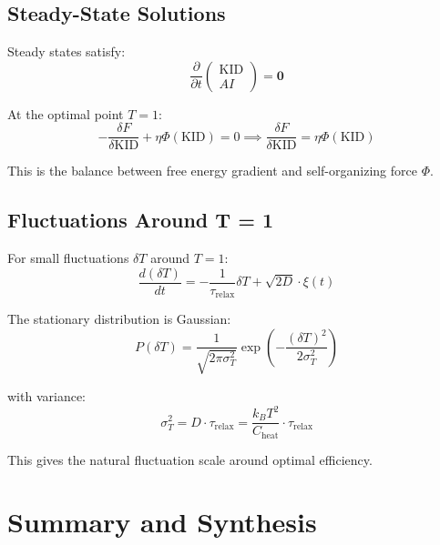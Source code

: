 \documentclass[11pt,a4paper]{article}
\begin{document}
\subsection{Steady-State Solutions}

Steady states satisfy:
\begin{equation}
\frac{\partial}{\partial t}\begin{pmatrix} \text{KID} \\ AI \end{pmatrix} = \mathbf{0}
\end{equation}

At the optimal point $T = 1$:
\begin{equation}
-\frac{\delta F}{\delta \text{KID}} + \eta \Phi(\text{KID}) = 0 \implies \frac{\delta F}{\delta \text{KID}} = \eta \Phi(\text{KID})
\end{equation}

This is the balance between free energy gradient and self-organizing force $\Phi$.

\subsection{Fluctuations Around T = 1}

For small fluctuations $\delta T$ around $T = 1$:
\begin{equation}
\frac{d(\delta T)}{dt} = -\frac{1}{\tau_{\text{relax}}} \delta T + \sqrt{2D} \cdot \xi(t)
\end{equation}

The stationary distribution is Gaussian:
\begin{equation}
P(\delta T) = \frac{1}{\sqrt{2\pi \sigma_T^2}} \exp\left(-\frac{(\delta T)^2}{2\sigma_T^2}\right)
\end{equation}

with variance:
\begin{equation}
\sigma_T^2 = D \cdot \tau_{\text{relax}} = \frac{k_B T^2}{C_{\text{heat}}} \cdot \tau_{\text{relax}}
\end{equation}

This gives the natural fluctuation scale around optimal efficiency.


\section{Summary and Synthesis}
\end{document}
